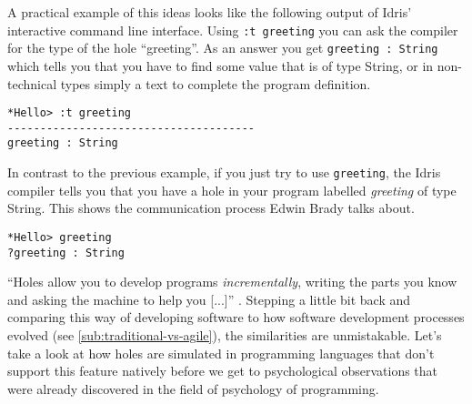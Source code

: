 A practical example of this ideas looks like the following output of Idris' interactive command line interface.
Using \verb|:t greeting| you can ask the compiler for the type of the hole ``greeting''.
As an answer you get \verb|greeting : String| which tells you that you have to find some value that is of type String, or in non-technical types simply a text to complete the program definition.

\begin{verbatim}
*Hello> :t greeting
--------------------------------------
greeting : String
\end{verbatim}

In contrast to the previous example, if you just try to use \verb|greeting|, the Idris compiler tells you that you have a hole in your program labelled \emph{greeting} of type String.
This shows the communication process Edwin Brady talks about.

\begin{verbatim}
*Hello> greeting
?greeting : String
\end{verbatim}

``Holes allow you to develop programs \emph{incrementally}, writing the parts you know and asking the machine to help you [...]'' \autocite[21]{brady_type-driven_2017}.
Stepping a little bit back and comparing this way of developing software to how software development processes evolved (see \cref{sub:traditional-vs-agile}), the similarities are unmistakable.
Let's take a look at how holes are simulated in programming languages that don't support this feature natively before we get to psychological observations that were already discovered in the field of psychology of programming.

